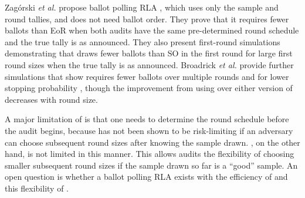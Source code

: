 Zag\'{o}rski {\em et al.} propose ballot polling RLA \Minerva \cite{usenix_minerva}, which uses only the sample and round tallies, and does not need ballot order. They prove that it requires fewer ballots than EoR \BRAVO when both audits have the same pre-determined round schedule and the true tally is as announced. 
They also present first-round simulations demonstrating that \Minerva draws fewer ballots than SO \BRAVO in the first round for large first round sizes when the true tally is as announced. 
Broadrick {\em et al.} provide further simulations that show \Minerva requires fewer ballots over multiple rounds and for lower stopping probability \cite{simulations}, though the improvement from using \Minerva over either version of \BRAVO decreases with round size. 

A major limitation of \Minerva is that one needs to determine the round schedule before the audit begins, because \Minerva has not been shown to be risk-limiting if an adversary can choose subsequent round sizes after knowing the sample drawn. \BRAVO, on the other hand, is not limited in this manner. This allows \BRAVO audits the flexibility of choosing smaller subsequent round sizes if the sample drawn so far is a ``good'' sample. An open question is whether a ballot polling RLA exists with the efficiency of \Minerva and this flexibility of \BRAVO.

